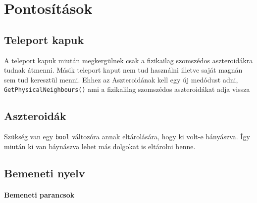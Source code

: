 \documentclass[../../projlab]{subfiles}
\begin{document}
\makeatletter


\makeatother

\chapter{Pontosítások}

\section{Teleport kapuk}
A teleport kapuk miután megkergülnek csak a fizikailag szomszédos aszteroidákra tudnak átmenni.
Másik teleport kaput nem tud használni illetve saját magnán sem tud keresztül menni.
Ehhez az Aszteroidának kell egy új medódust adni, \verb"GetPhysicalNeighbours()" ami a fizikalilag szomszédos aszteroidákat adja vissza

\section{Aszteroidák}
Szükség van egy \verb"bool" változóra annak eltárolására, hogy ki volt-e bányászva. 
Így miután ki van báynászva lehet más dolgokat is eltárolni benne.



\section{Bemeneti nyelv}

\subsubsection{Bemeneti parancsok}
\end{document}
